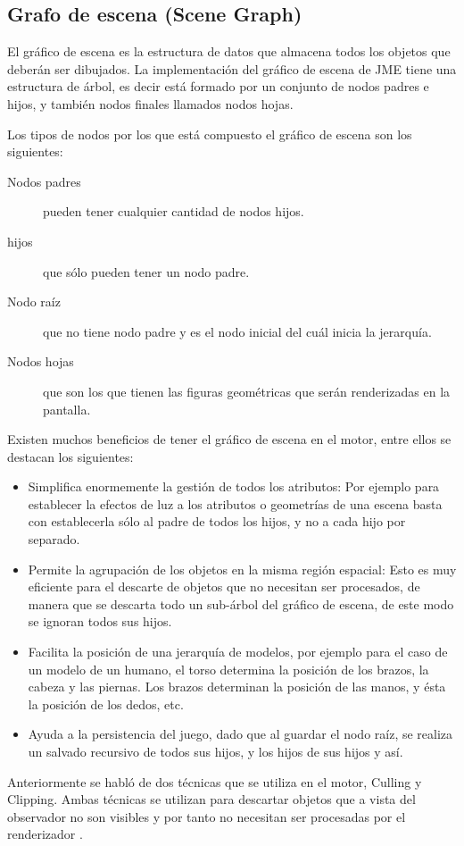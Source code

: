 \documentclass[a4paper,12pt,openany,oneside]{book}
\begin{document}
\subsection{Grafo de escena (Scene Graph)}
El gráfico de escena es la estructura de datos que almacena todos los objetos que deberán ser dibujados. La implementación del gráfico de escena de JME tiene una estructura de árbol, es decir está formado por un conjunto de nodos padres e hijos, y también nodos finales llamados nodos hojas.

Los tipos de nodos por los que está compuesto el gráfico de escena son los siguientes:
\begin{description}
\item[Nodos padres] pueden tener cualquier cantidad de nodos hijos. 
\item[hijos] que sólo pueden tener un nodo padre.
\item[Nodo raíz] que no tiene nodo padre y es el nodo inicial del cuál inicia la jerarquía.
\item[Nodos hojas] que son los que tienen las figuras geométricas que serán renderizadas en la pantalla.
\end{description}
Existen muchos beneficios de tener el gráfico de escena en el motor, entre ellos se destacan los siguientes:
\begin{itemize}
\item Simplifica enormemente la gestión de todos los atributos: Por ejemplo para establecer la efectos de luz a los atributos o geometrías de una escena basta con establecerla sólo al padre de todos los hijos, y no a cada hijo por separado.
\item Permite la agrupación de los objetos en la misma región espacial: Esto es muy eficiente para el descarte de objetos que no necesitan ser procesados, de manera que se descarta todo un sub-árbol del gráfico de escena, de este modo se ignoran todos sus hijos. 
\item Facilita la posición de una jerarquía de modelos, por ejemplo para el caso de un modelo de un humano, el torso determina la posición de los brazos, la cabeza y las piernas. Los brazos determinan la posición de las manos, y ésta la posición de los dedos, etc. 
\item Ayuda a la persistencia del juego, dado que al guardar el nodo raíz, se realiza un salvado recursivo de todos sus hijos, y los hijos de sus hijos y así.
\end{itemize}
Anteriormente se habló de dos técnicas que se utiliza en el motor, Culling y Clipping. Ambas técnicas se utilizan para descartar objetos que a vista del observador no son visibles y por tanto no necesitan ser procesadas por el renderizador \cite{BEGINNERS}.
\end{document}
